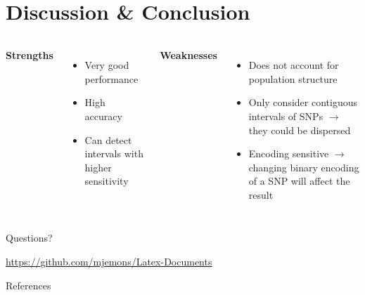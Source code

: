 \documentclass[aspectratio=32, 10pt]{beamer}
\begin{document}
\section{Discussion \& Conclusion}
\begin{frame}[fragile]{}
\begin{columns}[T,onlytextwidth]
\textbf{Strengths}
\vspace{12 pt}
\begin{itemize}
    \item Very good performance
    \item High accuracy
    \item Can detect intervals with higher sensitivity
\end{itemize}
\textbf{Weaknesses}
\begin{itemize}
    \item Does not account for population structure
    \item Only consider contiguous intervals of SNPs $\rightarrow$ they could be dispersed
    \item Encoding sensitive $\rightarrow$ changing binary encoding of a SNP will affect the result
    
\end{itemize}
\vspace{12 pt}
\end{columns}

\end{frame}



\begin{frame}[standout]
  Questions?
  \vspace{3cm}
  \begin{center}{\Large {}} \normalsize\url{https://github.com/mjemons/Latex-Documents}\end{center}
\end{frame}

    
\begin{frame}[allowframebreaks]{References}
  \nocite{*}
  
  

\end{frame}
\end{document}
